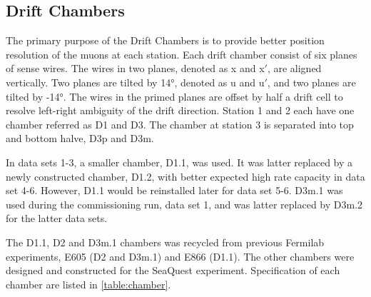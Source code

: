 \documentclass[../main.tex]{subfiles}
\begin{document}
\subsection{Drift Chambers}
The primary purpose of the Drift Chambers is to provide better position resolution of the muons
at each station. Each drift chamber consist of six planes of sense wires. The wires in two planes,
denoted as x and x$'$, are aligned vertically. Two planes are tilted by \ang[retain-explicit-plus]{+14},
denoted as u and u$'$, and two planes are tilted by \ang[retain-explicit-plus]{-14}. The wires
in the primed planes are offset by half a drift cell to resolve left-right ambiguity of the
drift direction. Station 1 and 2 each have one chamber referred as D1 and D3. The chamber at station
3 is separated into top and bottom halve, D3p and D3m.

In data sets 1-3, a smaller chamber, D1.1, was used. It was latter replaced by a newly constructed
chamber, D1.2, with better expected high rate capacity in data set 4-6. However, D1.1 would be 
reinstalled later for data set 5-6. D3m.1 was used during the commissioning run, data set 1, and
was latter replaced by D3m.2 for the latter data sets.

The D1.1, D2 and D3m.1 chambers was recycled from previous Fermilab experiments, E605 (D2 and D3m.1)
and E866 (D1.1). The other chambers were designed and constructed for the SeaQuest experiment.
Specification of each chamber are listed in \cref{table:chamber}.
\end{document}
